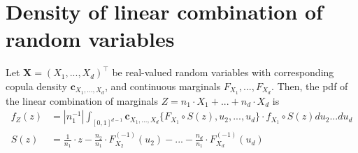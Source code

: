 \newpage
\appendix
\section{Density of linear combination of random variables}
\label{sec:appendix}
\begin{proposition}
   Let $\bm{X} = (X_1, ..., X_d)^\top$ be real-valued random variables with corresponding
   copula density $\bm{c}_{X_1, ..., X_d}$, and continuous marginals $F_{X_1}, ..., F_{X_d}$.
   Then, the
   pdf of the linear combination of marginals $Z = n_1 \cdot X_1 +
   ... +  n_d \cdot X_d $ is
   \begin{align}
   f_Z(z) &= \left| n_1^{-1} \right| \int_{[0,1]^{d-1}} \bm{c}_{X_1,...,X_d}
      \{F_{X_1} \circ S(z), u_2, ..., u_d \} \cdot
      f_{X_1} \circ S(z) du_2 ... du_d \label{density} \\
      S(z) &= \frac{1}{n_1}\cdot z - \frac{n_2}{n_1} \cdot F^{(-1)}_{X_2}(u_2) - ... -  \frac{n_d}{n_1} \cdot F^{(-1)}_{X_d}(u_d)
      \end{align}
   \end{proposition}

